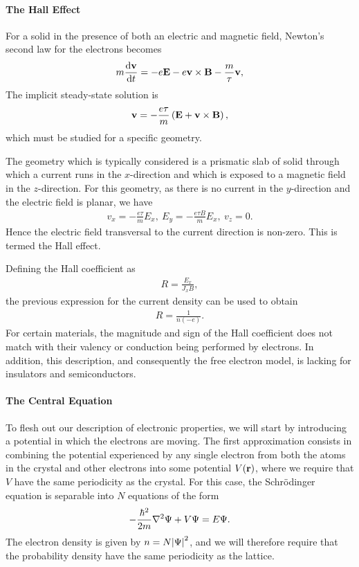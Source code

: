 \paragraph{The Hall Effect}
For a solid in the presence of both an electric and magnetic field, Newton's second law for the electrons becomes
\begin{align*}
	m\dv{\vb{v}}{t} = -e\vb{E} - e\vb{v}\times\vb{B} - \frac{m}{\tau}\vb{v},
\end{align*}
The implicit steady-state solution is
\begin{align*}
	\vb{v} = -\frac{e\tau}{m}\left(\vb{E} + \vb{v}\times\vb{B}\right),
\end{align*}
which must be studied for a specific geometry.

The geometry which is typically considered is a prismatic slab of solid through which a current runs in the $x$-direction and which is exposed to a magnetic field in the $z$-direction. For this geometry, as there is no current in the $y$-direction and the electric field is planar, we have
\begin{align*}
	v_{x} = -\frac{e\tau}{m}E_{x},\ E_{y} = -\frac{e\tau B}{m}E_{x},\ v_{z} = 0.
\end{align*}
Hence the electric field transversal to the current direction is non-zero. This is termed the Hall effect.

Defining the Hall coefficient as
\begin{align*}
	R = \frac{E_{x}}{J_{x}B},
\end{align*}
the previous expression for the current density can be used to obtain
\begin{align*}
	R = \frac{1}{n(-e)}.
\end{align*}
For certain materials, the magnitude and sign of the Hall coefficient does not match with their valency or conduction being performed by electrons. In addition, this description, and consequently the free electron model, is lacking for insulators and semiconductors.

\paragraph{The Central Equation}
To flesh out our description of electronic properties, we will start by introducing a potential in which the electrons are moving. The first approximation consists in combining the potential experienced by any single electron from both the atoms in the crystal and other electrons into some potential $V(\vb{r})$, where we require that $V$ have the same periodicity as the crystal. For this case, the Schrödinger equation is separable into $N$ equations of the form
\begin{align*}
	-\frac{\hbar^{2}}{2m}\laplacian{\Psi} + V\Psi = E\Psi.
\end{align*}
The electron density is given by $n = N\abs{\Psi}^{2}$, and we will therefore require that the probability density have the same periodicity as the lattice.

